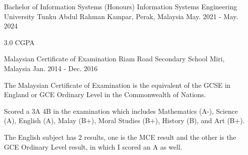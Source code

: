 

\begin{cventries}

  \cventry
    {Bachelor of Information Systems (Honours) Information Systems Engineering} %
    {University Tunku Abdul Rahman} %
    {Kampar, Perak, Malaysia} %
    {May. 2021 - May. 2024} %
    {
      \begin{cvitems} %
        \item {3.0 CGPA}
      \end{cvitems}
    }
    
  \cventry
    {Malaysian Certificate of Examination} %
    {Riam Road Secondary School} %
    {Miri, Malaysia} %
    {Jan. 2014 - Dec. 2016} %
    {
      \begin{cvitems} %
        \item {The Malaysian Certificate of Examination is the equivalent of the GCSE in England or GCE Ordinary Level in the Commonwealth of Nations.}
        \item {Scored a 3A 4B in the examination which includes Mathematics (A-), Science (A), English (A), Malay (B+), Moral Studies (B+), History (B), and Art (B+).}
        \item {The English subject has 2 results, one is the MCE result and the other is the GCE Ordinary Level result, in which I scored an A as well.}
      \end{cvitems}
    }
\end{cventries}
